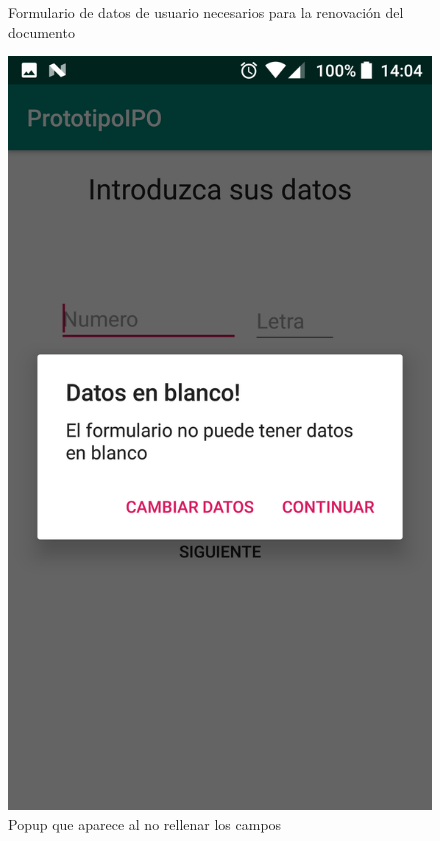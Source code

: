 \documentclass[a4paper,11pt]{article}
\begin{document}
\begin{figure}[H]
\begin{minipage}{0.45\linewidth}
\caption{Formulario de datos de usuario necesarios para la renovación del documento}
\label{form1}
\end{minipage}
\begin{minipage}{0.45\linewidth}
\includegraphics[width=\textwidth]{9.png}
\caption{Popup que aparece al no rellenar los campos}
\label{form2}
\end{minipage}



\end{figure}
\end{document}
